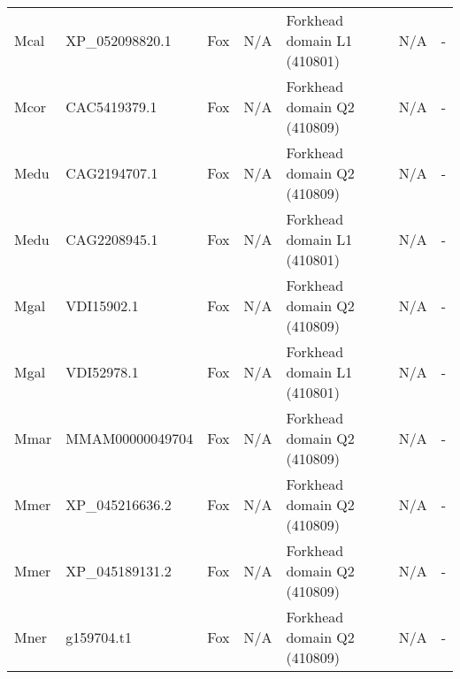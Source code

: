 \documentclass[../main.tex]{subfiles}
\begin{document}
\begin{landscape}
\begin{longtable}{lllllll}
		Mcal           & XP\_052098820.1       & Fox            & N/A                 & Forkhead domain L1 (410801)                 & N/A                                                                    & -                    \\
		Mcor           & CAC5419379.1          & Fox            & N/A                 & Forkhead domain Q2 (410809)                 & N/A                                                                    & -                    \\
		Medu           & CAG2194707.1          & Fox            & N/A                 & Forkhead domain Q2 (410809)                 & N/A                                                                    & -                    \\
		Medu           & CAG2208945.1          & Fox            & N/A                 & Forkhead domain L1 (410801)                 & N/A                                                                    & -                    \\
		Mgal           & VDI15902.1            & Fox            & N/A                 & Forkhead domain Q2 (410809)                 & N/A                                                                    & -                    \\
		Mgal           & VDI52978.1            & Fox            & N/A                 & Forkhead domain L1 (410801)                 & N/A                                                                    & -                    \\
		Mmar           & MMAM00000049704       & Fox            & N/A                 & Forkhead domain Q2 (410809)                 & N/A                                                                    & -                    \\
		Mmer           & XP\_045216636.2       & Fox            & N/A                 & Forkhead domain Q2 (410809)                 & N/A                                                                    & -                    \\
		Mmer           & XP\_045189131.2       & Fox            & N/A                 & Forkhead domain Q2 (410809)                 & N/A                                                                    & -                    \\
		Mner           & g159704.t1            & Fox            & N/A                 & Forkhead domain Q2 (410809)                 & N/A                                                                    & -                    \\

\end{longtable}
\end{landscape}
\end{document}
